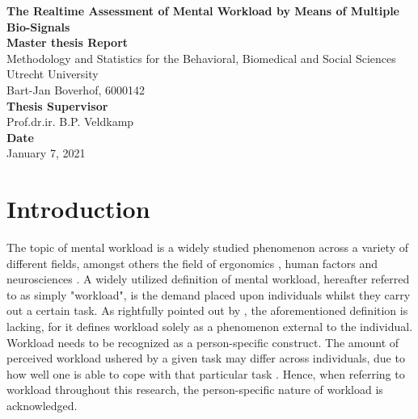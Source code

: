 \documentclass[12pt]{article}
\begin{document}
\begin{titlepage}
\begin{center}
\LARGE{\textbf{The Realtime Assessment of Mental Workload by Means of Multiple Bio-Signals}}\\
\vspace*{2\baselineskip}
\Large{\textbf{Master thesis Report}}\\
Methodology and Statistics for the Behavioral, Biomedical and Social Sciences\\
\vspace*{1\baselineskip}
Utrecht University\\
\vspace*{4\baselineskip}
{Bart-Jan Boverhof, 6000142}\\
\vspace*{1\baselineskip}
{\textbf{Thesis Supervisor}}\\
Prof.dr.ir. B.P. Veldkamp\\
\vspace*{1\baselineskip}
{\textbf{Date}}\\
January 7, 2021\\
\vspace*{1\baselineskip}
\end{center}
\end{titlepage}

\section{Introduction}
The topic of mental workload is a widely studied phenomenon across a variety of different fields, amongst others the field of ergonomics \cite{young2015state}, human factors \cite{pretorius2007development} and neurosciences \cite{shuggi2017mental}. A widely utilized definition of mental workload, hereafter referred to as simply "workload", is the demand placed upon individuals whilst they carry out a certain task. As rightfully pointed out by , the aforementioned definition is lacking, for it defines workload solely as a phenomenon external to the individual. Workload needs to be recognized as a person-specific construct. The amount of perceived workload ushered by a given task may differ across individuals, due to how well one is able to cope with that particular task \cite{de1996measurement}. Hence, when referring to workload throughout this research, the person-specific nature of workload is acknowledged.
\end{document}
